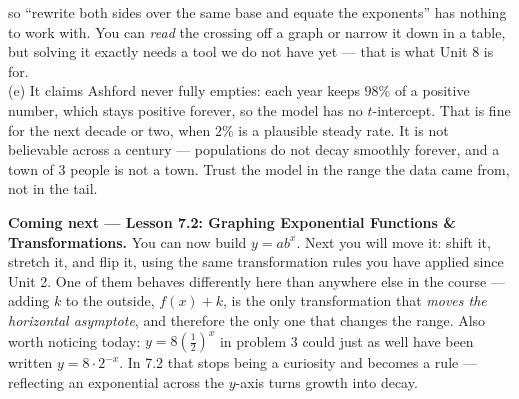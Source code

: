\documentclass[10pt]{article}
\begin{document}
\begin{extensionbox}
{so ``rewrite both sides over the same base and equate the exponents'' has nothing to work with. You
can \emph{read} the crossing off a graph or narrow it down in a table, but solving it exactly needs a
tool we do not have yet --- that is what Unit 8 is for.\\[3pt]
(e) It claims Ashford never fully empties: each year keeps $98\%$ of a positive number, which stays
positive forever, so the model has no $t$-intercept. That is fine for the next decade or two, when
$2\%$ is a plausible steady rate. It is not believable across a century --- populations do not decay
smoothly forever, and a town of $3$ people is not a town. Trust the model in the range the data came
from, not in the tail.}
\end{extensionbox}

\begin{spiralbox}
\textbf{Coming next --- Lesson 7.2: Graphing Exponential Functions \& Transformations.} You can now
build $y=ab^{x}$. Next you will move it: shift it, stretch it, and flip it, using the same
transformation rules you have applied since Unit 2. One of them behaves differently here than
anywhere else in the course --- adding $k$ to the outside, $f(x)+k$, is the only transformation that
\emph{moves the horizontal asymptote}, and therefore the only one that changes the range. Also worth
noticing today: $y=8\left(\frac12\right)^{x}$ in problem 3 could just as well have been written
$y=8\cdot 2^{-x}$. In 7.2 that stops being a curiosity and becomes a rule --- reflecting an
exponential across the $y$-axis turns growth into decay.
\end{spiralbox}
\end{document}
